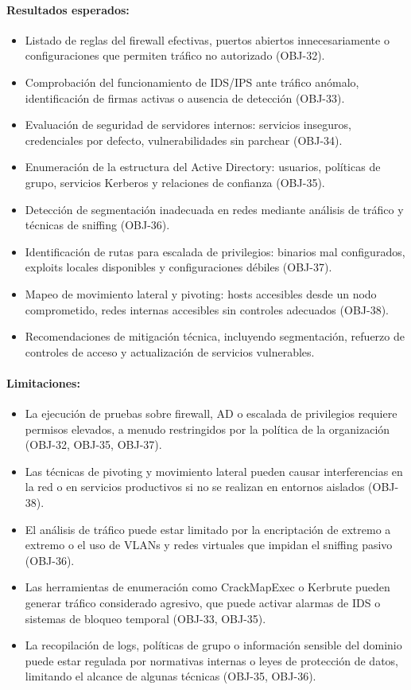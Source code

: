 \documentclass[a4paper, 10pt]{article}
\begin{document}
\paragraph{Resultados esperados:}
\begin{itemize}
    \item Listado de reglas del firewall efectivas, puertos abiertos innecesariamente o configuraciones que permiten tráfico no autorizado (OBJ-32).
    \item Comprobación del funcionamiento de IDS/IPS ante tráfico anómalo, identificación de firmas activas o ausencia de detección (OBJ-33).
    \item Evaluación de seguridad de servidores internos: servicios inseguros, credenciales por defecto, vulnerabilidades sin parchear (OBJ-34).
    \item Enumeración de la estructura del Active Directory: usuarios, políticas de grupo, servicios Kerberos y relaciones de confianza (OBJ-35).
    \item Detección de segmentación inadecuada en redes mediante análisis de tráfico y técnicas de sniffing (OBJ-36).
    \item Identificación de rutas para escalada de privilegios: binarios mal configurados, exploits locales disponibles y configuraciones débiles (OBJ-37).
    \item Mapeo de movimiento lateral y pivoting: hosts accesibles desde un nodo comprometido, redes internas accesibles sin controles adecuados (OBJ-38).
    \item Recomendaciones de mitigación técnica, incluyendo segmentación, refuerzo de controles de acceso y actualización de servicios vulnerables.
\end{itemize}

\paragraph{Limitaciones:}
\begin{itemize}
    \item La ejecución de pruebas sobre firewall, AD o escalada de privilegios requiere permisos elevados, a menudo restringidos por la política de la organización (OBJ-32, OBJ-35, OBJ-37).
    \item Las técnicas de pivoting y movimiento lateral pueden causar interferencias en la red o en servicios productivos si no se realizan en entornos aislados (OBJ-38).
    \item El análisis de tráfico puede estar limitado por la encriptación de extremo a extremo o el uso de VLANs y redes virtuales que impidan el sniffing pasivo (OBJ-36).
    \item Las herramientas de enumeración como CrackMapExec o Kerbrute pueden generar tráfico considerado agresivo, que puede activar alarmas de IDS o sistemas de bloqueo temporal (OBJ-33, OBJ-35).
    \item La recopilación de logs, políticas de grupo o información sensible del dominio puede estar regulada por normativas internas o leyes de protección de datos, limitando el alcance de algunas técnicas (OBJ-35, OBJ-36).
\end{itemize}
\end{document}
